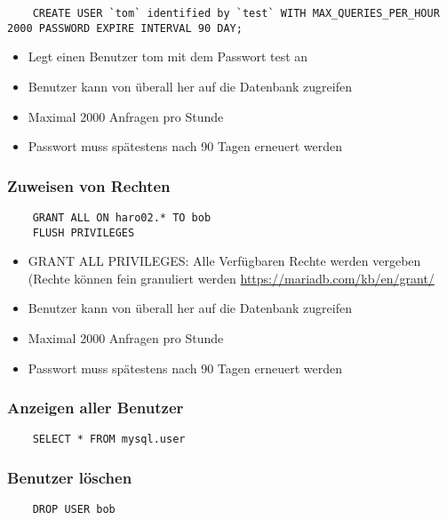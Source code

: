 \documentclass[asp1.tex]{subfiles}
\begin{document}
\vspace{20pt}
\begin{lstlisting}
    CREATE USER `tom` identified by `test` WITH MAX_QUERIES_PER_HOUR 2000 PASSWORD EXPIRE INTERVAL 90 DAY;
\end{lstlisting}
\begin{itemize}[topsep=-10pt]
    \item Legt einen Benutzer tom mit dem Passwort test an
    \item Benutzer kann von überall her auf die Datenbank zugreifen
    \item Maximal 2000 Anfragen pro Stunde
    \item Passwort muss spätestens nach 90 Tagen erneuert werden
\end{itemize}

\subsubsection{Zuweisen von Rechten}
\begin{lstlisting}
    GRANT ALL ON haro02.* TO bob
    FLUSH PRIVILEGES
\end{lstlisting}
\begin{itemize}[topsep=-10pt]
    \item GRANT ALL PRIVILEGES: Alle Verfügbaren Rechte werden vergeben (Rechte können fein granuliert werden \textrightarrow\space \url{https://mariadb.com/kb/en/grant/}
    \item Benutzer kann von überall her auf die Datenbank zugreifen
    \item Maximal 2000 Anfragen pro Stunde
    \item Passwort muss spätestens nach 90 Tagen erneuert werden
\end{itemize}

\subsubsection{Anzeigen aller Benutzer}
\begin{lstlisting}
    SELECT * FROM mysql.user
\end{lstlisting}

\subsubsection{Benutzer löschen}
\begin{lstlisting}
    DROP USER bob
\end{lstlisting}
\end{document}
